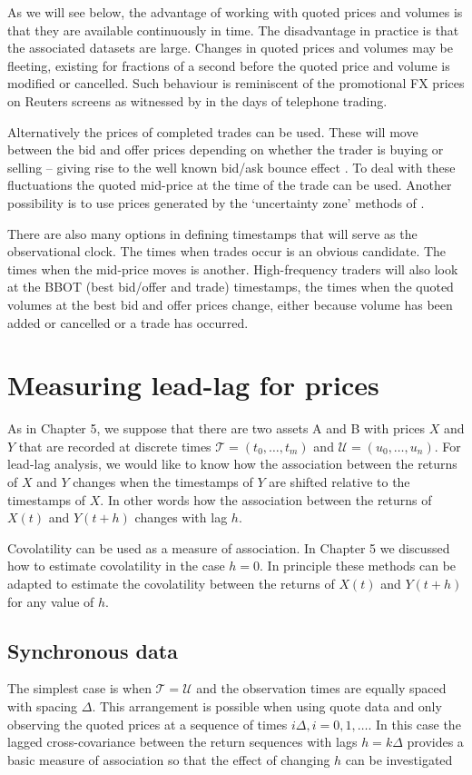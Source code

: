 As we will see below, the advantage of working with quoted prices and volumes is that they are available continuously in time. The disadvantage in practice is that the associated datasets are large.  Changes in quoted prices and volumes may be fleeting, existing for fractions of a second before the quoted price and volume is modified or cancelled. Such behaviour is reminiscent of the promotional FX prices on Reuters screens as witnessed by \citet{zhou1996high} in the days of telephone trading. 

Alternatively the prices of completed trades can be used. These will move between the bid and offer prices depending on whether the trader is buying or selling -- giving rise to the well known bid/ask bounce effect \citep{roll1984simple}.  To deal with these fluctuations the quoted mid-price at the time of the trade can be used. Another possibility is to use prices generated by the `uncertainty zone' methods of \citet{robert2012volatility}. 

There are also many options in defining timestamps that will serve as the observational clock.  The times when trades occur is an obvious candidate. The times when the mid-price moves is another. High-frequency traders will also look at the BBOT (best bid/offer and trade) timestamps, the times when the quoted volumes at the best bid and offer prices change, either because volume has been added or cancelled or a trade has occurred.  


\section{Measuring lead-lag for prices}
As in Chapter 5, we suppose that there are two assets A and B with prices $X$ and $Y$ that are recorded at discrete times
$\mathcal{T} = (t_0,\dots,t_{m})$ and
$\mathcal{U} = (u_0,\dots,u_{n})$. For lead-lag analysis, we would like to know how the association between the returns of $X$ and $Y$ changes when the timestamps of $Y$ are shifted relative to the timestamps of $X$. In other words how the association between the returns of $X(t)$ and  $Y(t+h)$ changes with lag $h$.  

Covolatility can be used as a measure of association. In Chapter 5 we discussed how to estimate covolatility in the case $h=0$.  In principle these methods can be adapted to estimate the covolatility between the returns of $X(t)$ and $Y(t+h)$ for any value of $h$.

\subsection{Synchronous data}
The simplest case is when $\mathcal{T} = \mathcal{U}$ and the observation times are equally spaced with spacing $\Delta$. This arrangement is possible  when using quote data and only observing the quoted prices at a sequence of times $i\Delta, i = 0,1,\dots$.  In this case the lagged cross-covariance between the return sequences with lags $h = k\Delta$ provides a basic measure of association so that the effect of changing $h$ can be investigated

